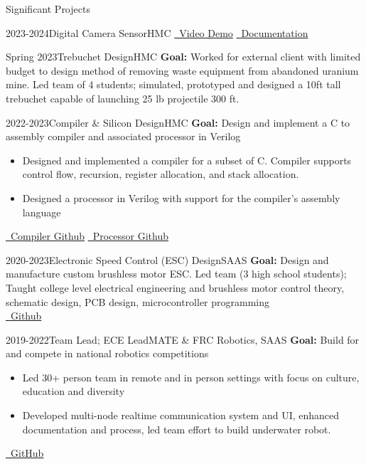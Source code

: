 \documentclass[]{mcdowellcv}
\begin{document}
\begin{cvsection}{Significant Projects}
\begin{cvsubsection}{2023-2024}{Digital Camera Sensor}{HMC}
		\href{https://www.youtube.com/shorts/lJYW2ZMiyLE}{\faYoutube \ Video Demo}
		\href{https://kavidey.github.io/NeoObscura/}{\faBook \ Documentation}
	\end{cvsubsection}
	\begin{cvsubsection}{Spring 2023}{\hypertarget{trebuchet_design}{Trebuchet Design}}{HMC}
		\textbf{Goal:} Worked for external client with limited budget to design method of removing waste equipment from abandoned uranium mine. Led team of 4 students; simulated, prototyped and designed a 10ft tall trebuchet capable of launching 25 lb projectile 300 ft.
	\end{cvsubsection}
	\begin{cvsubsection}{2022-2023}{Compiler \& Silicon Design}{HMC}
		\textbf{Goal:} Design and implement a C to assembly compiler and associated processor in Verilog
		\begin{itemize}
			\item Designed and implemented a compiler for a subset of C. Compiler supports control flow, recursion, register allocation, and stack allocation.
			\item Designed a processor in Verilog with support for the compiler's assembly language
		\end{itemize}
		\href{https://github.com/kavidey/HMMM-Compiler/}{\faGithub \ Compiler Github}
		\href{https://github.com/kavidey/Hmmm-Silicon/tree/main/verilog/rtl/hmmm/}{\faGithub \ Processor Github}
	\end{cvsubsection}
	\begin{cvsubsection}{2020-2023}{Electronic Speed Control (ESC) Design}{SAAS}
		\textbf{Goal:} Design and manufacture custom brushless motor ESC. Led team (3 high school students); Taught college level electrical engineering and brushless motor control theory, schematic design, PCB design, microcontroller programming
		\\
		\href{https://github.com/redshiftrobotics/blueshift-esc}{\faGithub \ Github}
	\end{cvsubsection}
	\begin{cvsubsection}{2019-2022}{Team Lead; ECE Lead}{MATE \& FRC Robotics, SAAS}
		\textbf{Goal:} Build for and compete in national robotics competitions
		\begin{itemize}
			\item Led 30+ person team in remote and in person settings with focus on culture, education and diversity
			\item Developed multi-node realtime communication system and UI, enhanced documentation and process, led team effort to build underwater robot.
		\end{itemize}
		\href{https://github.com/redshiftrobotics/}{\faGithub \ GitHub}
	\end{cvsubsection}
\end{cvsection}
\end{document}
